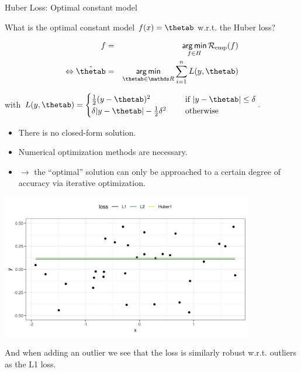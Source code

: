 \begin{vbframe}{Huber Loss: Optimal constant model}

What is the optimal constant model $\fx = \thetab$ w.r.t. the Huber loss?

\vspace{-0.2cm}
\begin{eqnarray*}
f &=& \argmin_{f \in \Hspace} \riskef\\
\Leftrightarrow
\hat \thetab&=& \argmin_{\thetab\in \R} \sumin L(y, \thetab)
\end{eqnarray*}

with $L(y, \thetab) = \begin{cases}
  \frac{1}{2}(y - \thetab)^2  & \text{ if } |y - \thetab| \le \delta \\
  \delta |y - \thetab|-\frac{1}{2}\delta^2 \quad & \text{ otherwise }
  \end{cases}. $

\begin{itemize}
\item There is no closed-form solution.
\item Numerical optimization methods are necessary.
\item $\to$  the \enquote{optimal} solution can only be approached to a certain degree of accuracy via iterative optimization.
\end{itemize}


\framebreak

\vspace{0.2cm}

\begin{center}
\includegraphics[width = 11cm ]{figure_man/Huber1.png} \\
\end{center}


\framebreak 

And when adding an outlier we see that the loss is similarly robust w.r.t. outliers as the L1 loss. 


\end{vbframe}
